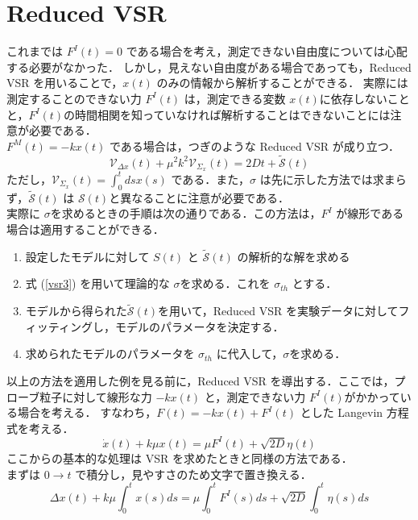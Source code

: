 \documentclass{jsarticle}
\numberwithin{equation}{section}
\theoremstyle{definition}
\begin{document}
\newpage 
\section{Reduced VSR}
これまでは $F^I (t) = 0$ である場合を考え，測定できない自由度については心配する必要がなかった．
しかし，見えない自由度がある場合であっても，Reduced VSR を用いることで，$x(t)$ のみの情報から解析することができる．
実際には測定することのできない力 $F^I (t)$ は，測定できる変数 $x(t)$に依存しないことと，$F^I (t)$の時間相関を知っていなければ解析することはできないことには注意が必要である．\\
\quad $F^M (t) = -kx(t)$ である場合は，つぎのような Reduced VSR が成り立つ．
\begin{equation}
  \mathcal{V} _{\Delta x} (t) + \mu^2 k^2 \mathcal{V} _{\Sigma_x} (t) = 2Dt + \tilde{\mathcal{S}}(t)
\end{equation}
ただし，$\mathcal{V} _{\Sigma_x} (t) = \int_0^t ds x(s)$ である．また，$\sigma $ は先に示した方法では求まらず，$\tilde{\mathcal{S}}(t)$ は $\mathcal{S} (t)$と異なることに注意が必要である．\\
\quad 実際に $\sigma $を求めるときの手順は次の通りである．この方法は，$F^I$ が線形である場合は適用することができる．
\begin{enumerate}
  \item 設定したモデルに対して $S(t)$ と $\tilde{\mathcal{S}}(t)$ の解析的な解を求める
  \item 式 (\ref{vsr3}) を用いて理論的な $\sigma$を求める．これを $\sigma_{th}$ とする．
  \item モデルから得られた$\tilde{\mathcal{S}}(t)$を用いて，Reduced VSR を実験データに対してフィッティングし，モデルのパラメータを決定する．
  \item 求められたモデルのパラメータを $\sigma_{th}$ に代入して，$\sigma$を求める．
\end{enumerate}
\quad 以上の方法を適用した例を見る前に，Reduced VSR を導出する．ここでは，プローブ粒子に対して線形な力 $-kx(t) $ と，測定できない力 $F^I (t)$がかかっている場合を考える．
すなわち，$F(t) = -kx(t) + F^I (t)$ とした Langevin 方程式を考える．
\begin{equation}
  \dot{x} (t) + k \mu x(t) = \mu F^I (t) + \sqrt{2D} \eta (t)
\end{equation}
ここからの基本的な処理は VSR を求めたときと同様の方法である． \\
\quad まずは $0 \to t$ で積分し，見やすさのため文字で置き換える．
\begin{equation}
  \Delta x(t) + k \mu \int_0^t x(s) ds = \mu \int_0^t F^I (s) ds + \sqrt{2D} \int_0^t \eta(s) ds 
\end{equation}
\end{document}

